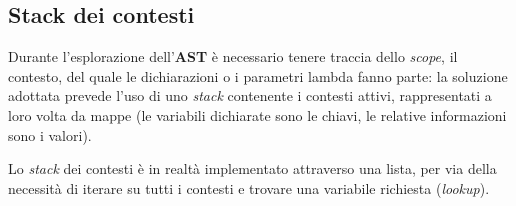 \subsection{Stack dei contesti}
\label{sec:5-12-scope-stack}

Durante l'esplorazione dell'\textbf{AST} è necessario tenere traccia dello \textit{scope}, il contesto, del quale le dichiarazioni
o i parametri lambda fanno parte: la soluzione adottata prevede l'uso di uno \textit{stack} contenente i contesti attivi,
rappresentati a loro volta da mappe (le variabili dichiarate sono le chiavi, le relative informazioni sono i valori).

\noindent Lo \textit{stack} dei contesti è in realtà implementato attraverso una lista, per via della necessità di iterare
su tutti i contesti e trovare una variabile richiesta (\textit{lookup}).

